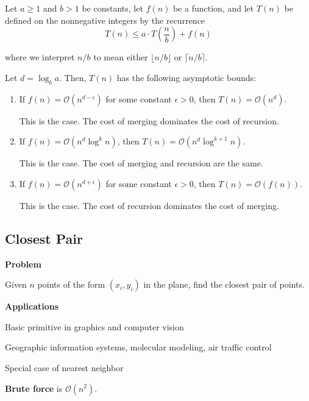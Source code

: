 \begin{theorem}
    Let $a \ge 1$ and $b > 1$ be constants, let $f(n)$ be a function, and let $T(n)$ be defined on the nonnegative integers by the recurrence \[
        T(n) \le a \cdot T\left( \frac{n}{b} \right) + f(n)
    \]

    where we interpret $n/b$ to mean either $\lfloor n/b \rfloor$ or $\lceil n/b \rceil$. 
    
    Let $d = \log_b a$. Then, $T(n)$ has the following asymptotic bounds:
    \begin{enumerate}
        \item If $f(n) = \mathcal{O}(n^{d - \epsilon})$ for some constant $\epsilon > 0$, then $T(n) = \mathcal{O}(n^d)$.

        This is the  case. The cost of merging dominates the cost of recursion.

        \item If $f(n) = \mathcal{O}(n^d \log^k n)$, then $T(n) = \mathcal{O}(n^d \log^{k+1} n)$.

        This is the  case. The cost of merging and recursion are the same.

        \item If $f(n) = \mathcal{O}(n^{d + \epsilon})$ for some constant $\epsilon > 0$, then $T(n) = \mathcal{O}(f(n))$.

        This is the  case. The cost of recursion dominates the cost of merging.
    \end{enumerate}
\end{theorem}

\subsection{Closest Pair}

\begin{listu}
    \item \textbf{Problem}
    
    Given $n$ points of the form $(x_i, y_i)$ in the plane, find the closest pair of points.

    \item \textbf{Applications}
    
    \begin{listu}
        \item Basic primitive in graphics and computer vision
        \item Geographic information systems, molecular modeling, air traffic control
        \item Special case of nearest neighbor
    \end{listu}

    \item \textbf{Brute force} is $\mathcal{O}(n^2)$.
\end{listu}

